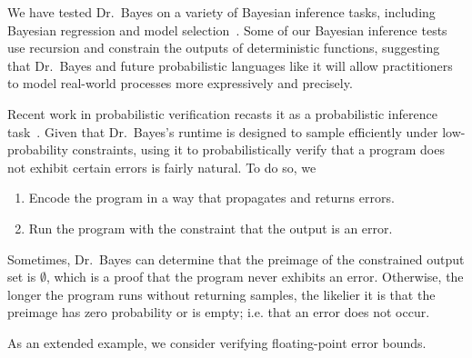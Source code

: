 \documentclass{llncs}
\begin{document}
We have tested Dr.~Bayes on a variety of Bayesian inference tasks, including Bayesian regression and model selection~\cite{cit:toronto-thesis}.
Some of our Bayesian inference tests use recursion and constrain the outputs of deterministic functions, suggesting that Dr.~Bayes and future probabilistic languages like it will allow practitioners to model real-world processes more expressively and precisely.

Recent work in probabilistic verification recasts it as a probabilistic inference task~\cite{cit:gulwani-2007popl-prob-verify}.
Given that Dr.~Bayes's runtime is designed to sample efficiently under low-probability constraints, using it to probabilistically verify that a program does not exhibit certain errors is fairly natural.
To do so, we
\begin{enumerate}
	\item Encode the program in a way that propagates and returns errors.
	\item Run the program with the constraint that the output is an error.
\end{enumerate}
Sometimes, Dr.~Bayes can determine that the preimage of the constrained output set is $\emptyset$, which is a proof that the program never exhibits an error.
Otherwise, the longer the program runs without returning samples, the likelier it is that the preimage has zero probability or is empty; i.e. that an error does not occur.

As an extended example, we consider verifying floating-point error bounds.
\end{document}
